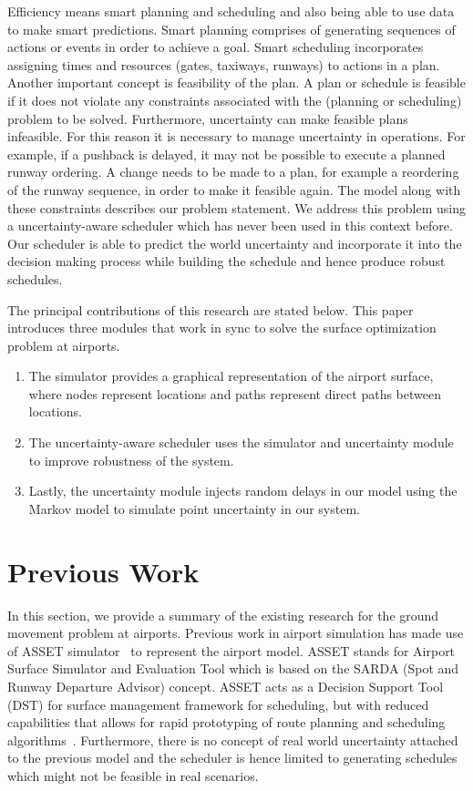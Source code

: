 \documentclass[conference]{IEEEtran}
\begin{document}
Efficiency means smart planning and scheduling and also being able to use data to make smart predictions. Smart planning comprises of generating sequences of actions or events in order to achieve a goal. Smart scheduling incorporates assigning times and resources (gates, taxiways, runways) to actions in a plan. Another important concept is feasibility of the plan. A plan or schedule is feasible if it does not violate any constraints associated with the (planning or scheduling) problem to be solved. Furthermore, uncertainty can make feasible plans infeasible. For this reason it is necessary to manage uncertainty in operations. For example, if a pushback is delayed, it may not be possible to execute a planned runway ordering. A change needs to be made to a plan, for example a reordering of the runway sequence, in order to make it feasible again. The model along with these constraints describes our problem statement. We address this problem using a uncertainty-aware scheduler which has never been used in this context before. Our scheduler is able to predict the world uncertainty and incorporate it into the decision making process while building the schedule and hence produce robust schedules.

The principal contributions of this research are stated below. This paper introduces three modules that work in sync to solve the surface optimization problem at airports.

\begin{enumerate}
    \item The simulator provides a graphical representation of the airport surface, where nodes represent locations and paths represent direct paths between locations.
    \item The uncertainty-aware scheduler uses the simulator and uncertainty module to improve robustness of the system.
    \item Lastly, the uncertainty module injects random delays in our model using the Markov model to simulate point uncertainty in our system. 
\end{enumerate}

\section{Previous Work}

In this section, we provide a summary of the existing research for the ground movement problem at airports. Previous work in airport simulation has made use of ASSET simulator~\cite{morris2016planning} to represent the airport model. ASSET stands for Airport Surface Simulator and Evaluation Tool which is based on the SARDA (Spot and Runway Departure Advisor) concept. ASSET acts as a Decision Support Tool (DST) for surface management framework for scheduling, but with reduced capabilities that allows for rapid prototyping of route planning and scheduling algorithms~\cite{malik2016exact}. Furthermore, there is no concept of real world uncertainty attached to the previous model and the scheduler is hence limited to generating schedules which might not be feasible in real scenarios.
\end{document}
